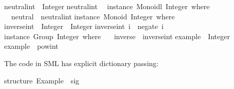 \begin{isabellebody}
\begin{isamarkuptext}
\isanewline
neutral{}int\ {}{}\ Integer{}\isanewline
neutral{}int\ {}\ {}{}\isanewline
\isanewline
instance\ Monoidl\ Integer\ where\ {}\isanewline
\ \ neutral\ {}\ neutral{}int{}\isanewline
{}{}\isanewline
\isanewline
instance\ Monoid\ Integer\ where\ {}\isanewline
{}{}\isanewline
\isanewline
inverse{}int\ {}{}\ Integer\ {}{}\ Integer{}\isanewline
inverse{}int\ i\ {}\ negate\ i{}\isanewline
\isanewline
instance\ Group\ Integer\ where\ {}\isanewline
\ \ inverse\ {}\ inverse{}int{}\isanewline
{}{}\isanewline
\isanewline
example\ {}{}\ Integer{}\isanewline
example\ {}\ pow{}int\ {}{}\ {}{}{}{}{}\isanewline
\isanewline
{}\isanewline%
\end{isamarkuptext}%
\isamarkuptrue%
%
\endisatagquotetypewriter
{\isafoldquotetypewriter}%
%
\isadelimquotetypewriter
%
\endisadelimquotetypewriter
%
\begin{isamarkuptext}%
\noindent The code in SML has explicit dictionary passing:%
\end{isamarkuptext}%
\isamarkuptrue%
%
\isadelimquotetypewriter
%
\endisadelimquotetypewriter
%
\isatagquotetypewriter
%
\begin{isamarkuptext}%
structure\ Example\ {}\ sig\isanewline

\end{isamarkuptext}
\end{isabellebody}
